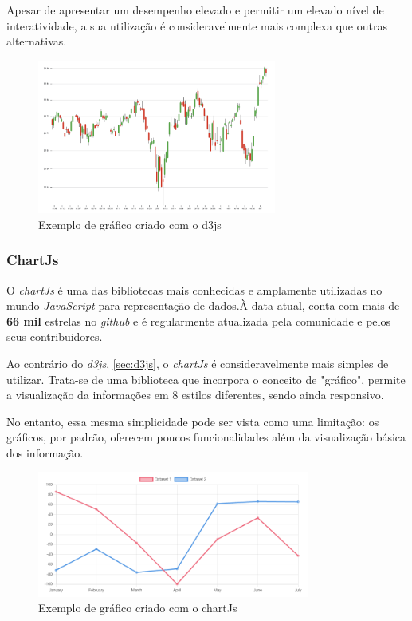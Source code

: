 Apesar de apresentar um desempenho elevado e permitir um elevado nível de interatividade, a sua utilização é consideravelmente mais complexa que outras alternativas.


\begin{figure}[h!]
    \centering
    \includegraphics[width=0.7\textwidth]{figs/d3js.png}
    \caption[Gráfico d3js]{Exemplo de gráfico criado com o d3js}
    \label{fig:d3js}
\end{figure}

\subsubsection{\textbf{ChartJs}}\label{sec:chartjs}
O \textit{chartJs} é uma das bibliotecas mais conhecidas e amplamente utilizadas no mundo \textit{JavaScript} para representação de dados.À data atual, conta com mais de \textbf{66 mil} estrelas no \textit{github}\cite{chartJs.github.url} e é regularmente atualizada pela comunidade e pelos seus contribuidores.

Ao contrário do \textit{d3js}, \ref{sec:d3js}, o \textit{chartJs} é consideravelmente mais simples de utilizar. Trata-se de uma biblioteca que incorpora o conceito  de "gráfico", permite a visualização da informações em 8 estilos diferentes, sendo ainda responsivo. 

No entanto, essa mesma simplicidade pode ser vista como uma limitação: os gráficos, por padrão, oferecem poucos funcionalidades além da visualização básica dos informação.

\begin{figure}[h!]
    \centering
    \includegraphics[width=0.8\textwidth]{figs/chartJs.png}
    \caption[Gráfico chartJs]{Exemplo de gráfico criado com o chartJs}
    \label{fig:chartjs}
\end{figure}

